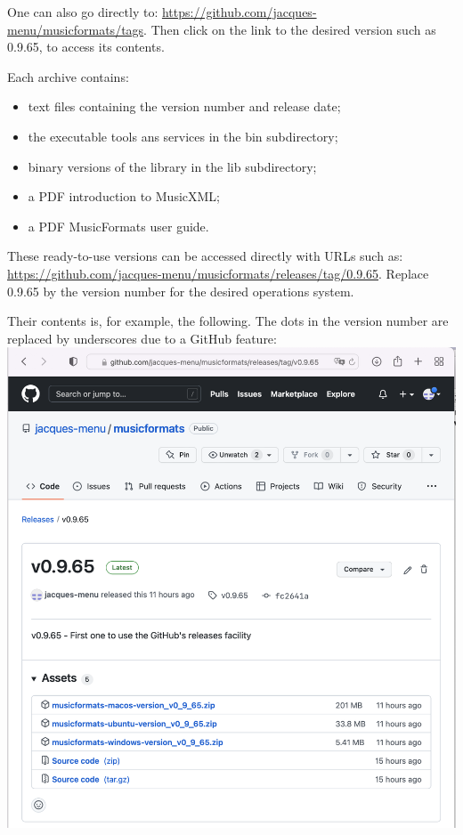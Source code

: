 One can also go directly to:
\url{https://github.com/jacques-menu/musicformats/tags}.
Then click on the link to the desired version such as 0.9.65, to access its contents.

Each  archive contains:
\begin{itemize}
\item  text files containing the version number and release date;
\item  the executable tools ans services in the bin subdirectory;
\item  binary versions of the library in the lib subdirectory;
\item  a PDF introduction to MusicXML;
\item  a PDF MusicFormats user guide.
\end{itemize}

These ready-to-use versions can be accessed directly with URLs such as:
\url{https://github.com/jacques-menu/musicformats/releases/tag/0.9.65}.
Replace 0.9.65 by the version number for the desired operations system.

Their contents is, for example, the following. The dots in the version number are replaced by underscores due to a GitHub feature:\\
\includegraphics[scale=0.5]{../mfgraphics/mfgraphicsReadyToUseVersionContents.png}

